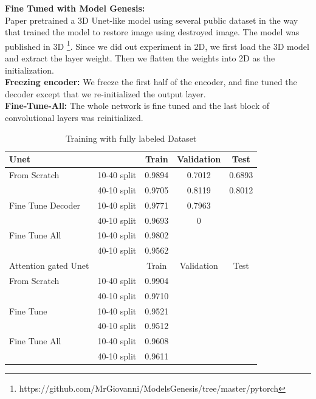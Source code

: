 \textbf{Fine Tuned with Model Genesis:}\\

{\color{red}Paper \cite{zhou_models_2019} pretrained a 3D Unet-like model using several public dataset in the way that trained the model to restore image using destroyed image. The model was published in 3D \footnote{https://github.com/MrGiovanni/ModelsGenesis/tree/master/pytorch}. Since we did out experiment in 2D, we first load the 3D model and extract the layer weight. Then we flatten the weights into 2D as the initialization.}\\

\textbf{Freezing encoder:}
We freeze the first half of the encoder, and fine tuned the decoder except that we re-initialized the output layer.\\

\textbf{Fine-Tune-All:}
The whole network is fine tuned and the last block of convolutional layers was reinitialized. \\

\begin{table}[h]
	\centering
	\begin{tabular}{l  c c c c}
	\hline
	\hline
	Unet	&		&	Train	&	Validation	&	Test	\\
	\hline
	From Scratch	&	10-40 split	&	0.9894	&	0.7012	&	0.6893	\\
			&	40-10 split	&	0.9705	&	0.8119	&	0.8012	\\
	Fine Tune Decoder	&	10-40 split	&	0.9771	&	0.7963	&		\\
			&	40-10 split	&	0.9693	&	0	&		\\
	Fine Tune All	&	10-40 split	&	0.9802	&		&		\\
			&	40-10 split	&	0.9562	&		&		\\
	\hline
	\hline
	Attention gated Unet	&		&	Train	&	Validation	&	Test	\\
	\hline
	From Scratch	&	10-40 split	&	0.9904	&		&		\\
				&	40-10 split	&	0.9710	&		&		\\
	Fine Tune	&	10-40 split	&	0.9521	&		&		\\
				&	40-10 split	&	0.9512	&		&		\\
	Fine Tune All	&	10-40 split	&	0.9608	&		&		\\
				&	40-10 split	&	0.9611	&		&		\\	
	\hline
	\hline
	\end{tabular}
	\caption{Training with fully labeled Dataset}
	\label{tab:fully-label-result}
\end{table}
	


